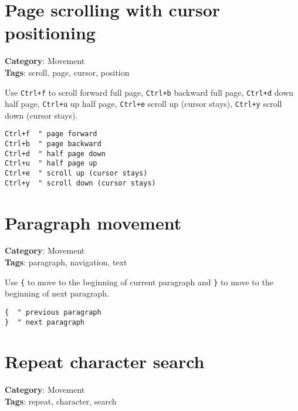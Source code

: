 {{{{{{{{\section{Page scrolling with cursor positioning}

\textbf{Category}: Movement\\ \textbf{Tags}: scroll, page, cursor, position
\vspace{0.5cm}

Use {\footnotesize \Verb§Ctrl+f§} to scroll forward full page, {\footnotesize \Verb§Ctrl+b§} backward full page, {\footnotesize \Verb§Ctrl+d§} down half page, {\footnotesize \Verb§Ctrl+u§} up half page, {\footnotesize \Verb§Ctrl+e§} scroll up (cursor stays), {\footnotesize \Verb§Ctrl+y§} scroll down (cursor stays).

\begin{Exa*}{}
\begin{Verbatim}[fontsize=\footnotesize, breaklines, breakanywhere]
Ctrl+f  " page forward
Ctrl+b  " page backward  
Ctrl+d  " half page down
Ctrl+u  " half page up
Ctrl+e  " scroll up (cursor stays)
Ctrl+y  " scroll down (cursor stays)
\end{Verbatim}
\end{Exa*}

\section{Paragraph movement}

\textbf{Category}: Movement\\ \textbf{Tags}: paragraph, navigation, text
\vspace{0.5cm}

Use {\footnotesize \Verb§{§} to move to the beginning of current paragraph and {\footnotesize \Verb§}§} to move to the beginning of next paragraph.

\begin{Exa*}{}
\begin{Verbatim}[fontsize=\footnotesize, breaklines, breakanywhere]
{  " previous paragraph
}  " next paragraph
\end{Verbatim}
\end{Exa*}

\section{Repeat character search}

\textbf{Category}: Movement\\ \textbf{Tags}: repeat, character, search
\vspace{0.5cm}

}}}}}}}}
